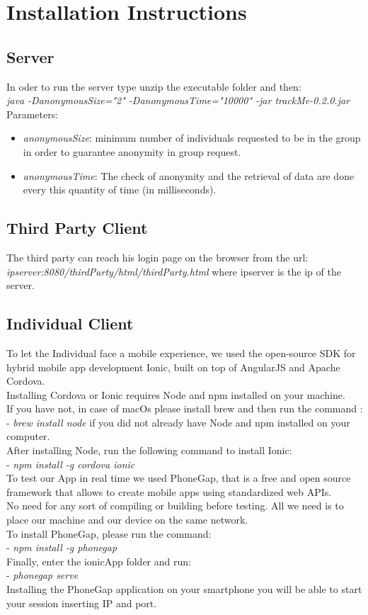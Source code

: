 \section{Installation Instructions} 

\subsection{Server}
In oder to run the server type unzip the executable folder and then: \\
\textit{java -DanonymousSize="2" -DanonymousTime="10000" -jar trackMe-0.2.0.jar}
Parameters:
\begin{itemize}
	\item \textit{anonymousSize}: minimum number of individuals requested to be in the group in order to guarantee anonymity in group request.
	\item \textit{anonymousTime}: The check of anonymity and the retrieval of data are done every this quantity of time (in milliseconds).
\end{itemize}

\subsection{Third Party Client}
The third party can reach his login page on the browser from the url:\\ \textit{ipserver:8080/thirdParty/html/thirdParty.html} where ipserver is the ip of the server.

\subsection{Individual Client}
 To let the Individual face a mobile experience, we used the open-source SDK for hybrid mobile app development Ionic, built on top of AngularJS and Apache Cordova.\\	Installing Cordova or Ionic requires Node and npm installed on your machine. \\If you have not, in case of macOs please install brew and then run the command :\\
 - \textit{brew install node} if you did not already have Node and npm installed on your computer.\\
After installing Node, run the following command to install Ionic:\\
- \textit{npm install -g cordova ionic}\\
To test our App in real time we used PhoneGap, that is a free and open source framework that allows to create mobile apps using standardized web APIs.\\No need for any sort of compiling or building before testing. All we need is to place our machine and our device on the same network.\\
To install PhoneGap, please run the command:\\
- \textit{npm install -g phonegap}\\
Finally, enter the ionicApp folder and run:\\
- \textit{phonegap serve}\\
Installing the PhoneGap application on your smartphone you will be able to start your session inserting IP and port.
 